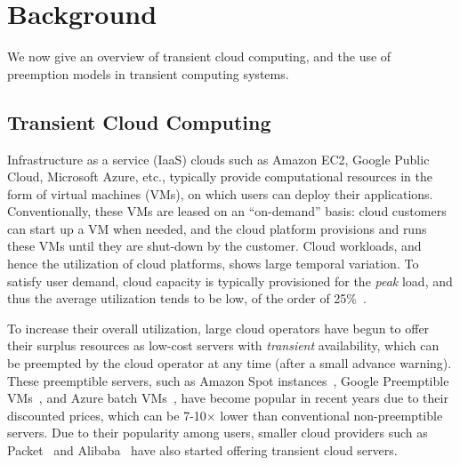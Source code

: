 \section{Background}

We now give an overview of transient cloud computing, and the  use of preemption models in transient computing systems. 



\subsection{Transient Cloud Computing}

Infrastructure as a service (IaaS) clouds such as Amazon EC2, Google Public Cloud, Microsoft Azure, etc., typically provide computational resources in the form of virtual machines (VMs), on which users can deploy their applications.
Conventionally, these VMs are leased on an ``on-demand'' basis: cloud customers can start up a VM when needed, and the cloud platform provisions and runs these VMs until they are shut-down by the customer. 
Cloud workloads, and hence the utilization of cloud platforms, shows large temporal variation. 
To satisfy user demand, cloud capacity is typically provisioned for the \emph{peak} load, and thus the average utilization tends to be low, of the order of 25\%~\cite{borg,resource-central-sosp17}. 


To increase their overall utilization, large cloud operators have begun to offer their surplus resources as low-cost servers \footnotemark with \emph{transient} availability, which can be preempted by the cloud operator at any time (after a small advance warning). 
These preemptible servers, such as Amazon Spot instances~\cite{ec2-spot}, Google Preemptible VMs~\cite{preemptible-documentation}, and Azure batch VMs~\cite{azure-batch}, have become popular in recent years due to their discounted prices, which can be 7-10$\times$ lower than conventional non-preemptible servers. 
Due to their popularity among users, smaller cloud providers such as Packet~\cite{packet-spot} and Alibaba~\cite{alibaba-spot} have also started offering transient cloud servers. 

